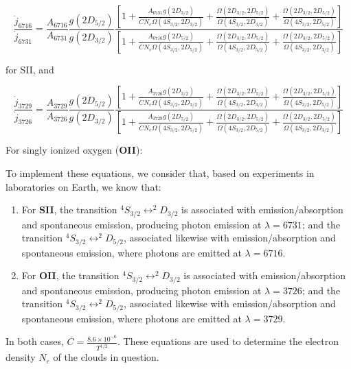 \documentclass{article}
\begin{document}
\[
\frac{\dot{j}_{6716}}{\dot{j}_{6731}} =
\frac{A_{6716}}{A_{6731}} \frac{g(2D_{5/2})}{g(2D_{3/2})} 
\frac{\left[1 + \frac{A_{6731} g(2D_{3/2})}{C N_e \Omega(4S_{3/2}, 2D_{3/2})}
+ \frac{\Omega(2D_{3/2}, 2D_{5/2})}{\Omega(4S_{3/2}, 2D_{3/2})}
+ \frac{\Omega(2D_{3/2}, 2D_{5/2})}{\Omega(4S_{3/2}, 2D_{5/2})}
\right]}
{\left[1 + \frac{A_{6716} g(2D_{5/2})}{C N_e \Omega(4S_{3/2}, 2D_{5/2})}
+ \frac{\Omega(2D_{3/2}, 2D_{5/2})}{\Omega(4S_{3/2}, 2D_{5/2})}
+ \frac{\Omega(2D_{3/2}, 2D_{5/2})}{\Omega(4S_{3/2}, 2D_{3/2})}
\right]}
\]

for SII, and

\[
\frac{\dot{j}_{3729}}{\dot{j}_{3726}} =
\frac{A_{3729}}{A_{3726}} \frac{g(2D_{5/2})}{g(2D_{3/2})} 
\frac{\left[1 + \frac{A_{3726} g(2D_{3/2})}{C N_e \Omega(4S_{3/2}, 2D_{3/2})}
+ \frac{\Omega(2D_{3/2}, 2D_{5/2})}{\Omega(4S_{3/2}, 2D_{3/2})}
+ \frac{\Omega(2D_{3/2}, 2D_{5/2})}{\Omega(4S_{3/2}, 2D_{5/2})}
\right]}
{\left[1 + \frac{A_{3729} g(2D_{5/2})}{C N_e \Omega(4S_{3/2}, 2D_{5/2})}
+ \frac{\Omega(2D_{3/2}, 2D_{5/2})}{\Omega(4S_{3/2}, 2D_{5/2})}
+ \frac{\Omega(2D_{3/2}, 2D_{5/2})}{\Omega(4S_{3/2}, 2D_{3/2})}
\right]}
\]

For singly ionized oxygen (\textbf{OII}):

To implement these equations, we consider that, based on experiments in laboratories on Earth, we know that:

\begin{enumerate}
    \item For \textbf{SII}, the transition $^4S_{3/2} \leftrightarrow ^2D_{3/2}$ is associated with emission/absorption and spontaneous emission, producing photon emission at $\lambda = 6731$; and the transition $^4S_{3/2} \leftrightarrow ^2D_{5/2}$, associated likewise with emission/absorption and spontaneous emission, where photons are emitted at $\lambda = 6716$.

    \item For \textbf{OII}, the transition $^4S_{3/2} \leftrightarrow ^2D_{3/2}$ is associated with emission/absorption and spontaneous emission, producing photon emission at $\lambda = 3726$; and the transition $^4S_{3/2} \leftrightarrow ^2D_{5/2}$, associated likewise with emission/absorption and spontaneous emission, where photons are emitted at $\lambda = 3729$.
\end{enumerate}

In both cases, $C = \frac{8.6 \times 10^{-6}}{T^{1/2}}$. These equations are used to determine the electron density $N_e$ of the clouds in question.
\end{document}
